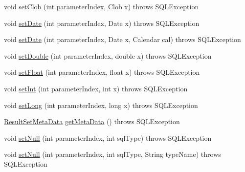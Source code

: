 \begin{DoxyCompactItemize}
\item 
void \mbox{\hyperlink{classcom_1_1mysql_1_1cj_1_1jdbc_1_1_prepared_statement_wrapper_aa1ff112e49bbfce983bbade82700b654}{set\+Clob}} (int parameter\+Index, \mbox{\hyperlink{classcom_1_1mysql_1_1cj_1_1jdbc_1_1_clob}{Clob}} x)  throws S\+Q\+L\+Exception 
\item 
void \mbox{\hyperlink{classcom_1_1mysql_1_1cj_1_1jdbc_1_1_prepared_statement_wrapper_ade7a75bb5fbec4288b9ec3dc88bef2a0}{set\+Date}} (int parameter\+Index, Date x)  throws S\+Q\+L\+Exception 
\item 
void \mbox{\hyperlink{classcom_1_1mysql_1_1cj_1_1jdbc_1_1_prepared_statement_wrapper_a87fc86f44f377ee29216f0d2da15f9f0}{set\+Date}} (int parameter\+Index, Date x, Calendar cal)  throws S\+Q\+L\+Exception 
\item 
void \mbox{\hyperlink{classcom_1_1mysql_1_1cj_1_1jdbc_1_1_prepared_statement_wrapper_adbfd679f308d47e65f17e2901889befc}{set\+Double}} (int parameter\+Index, double x)  throws S\+Q\+L\+Exception 
\item 
void \mbox{\hyperlink{classcom_1_1mysql_1_1cj_1_1jdbc_1_1_prepared_statement_wrapper_a0aa73e684f25bdcd9ddcf5ec20ca949c}{set\+Float}} (int parameter\+Index, float x)  throws S\+Q\+L\+Exception 
\item 
void \mbox{\hyperlink{classcom_1_1mysql_1_1cj_1_1jdbc_1_1_prepared_statement_wrapper_afa78a310967f1ebb16e22417c3e22171}{set\+Int}} (int parameter\+Index, int x)  throws S\+Q\+L\+Exception 
\item 
void \mbox{\hyperlink{classcom_1_1mysql_1_1cj_1_1jdbc_1_1_prepared_statement_wrapper_ace23eedea1457376ef7875a0acfa06cc}{set\+Long}} (int parameter\+Index, long x)  throws S\+Q\+L\+Exception 
\item 
\mbox{\hyperlink{classcom_1_1mysql_1_1cj_1_1jdbc_1_1result_1_1_result_set_meta_data}{Result\+Set\+Meta\+Data}} \mbox{\hyperlink{classcom_1_1mysql_1_1cj_1_1jdbc_1_1_prepared_statement_wrapper_a3d7687254e82a111bbb1960f43092a2a}{get\+Meta\+Data}} ()  throws S\+Q\+L\+Exception 
\item 
void \mbox{\hyperlink{classcom_1_1mysql_1_1cj_1_1jdbc_1_1_prepared_statement_wrapper_a37ca84e47cca54780c52fa6b0c567567}{set\+Null}} (int parameter\+Index, int sql\+Type)  throws S\+Q\+L\+Exception 
\item 
void \mbox{\hyperlink{classcom_1_1mysql_1_1cj_1_1jdbc_1_1_prepared_statement_wrapper_aa2bf1279bfaae2a76011e656225cad6f}{set\+Null}} (int parameter\+Index, int sql\+Type, String type\+Name)  throws S\+Q\+L\+Exception 
\item 

\end{DoxyCompactItemize}

